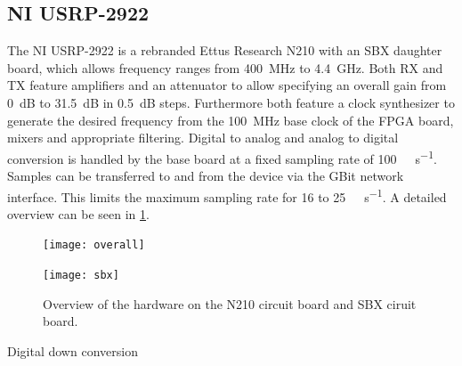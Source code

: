 \documentclass[12pt,a4paper,parskip=full]{scrartcl}
\begin{document}
\subsection{NI USRP-2922}
The NI USRP-2922 is a rebranded Ettus Research N210 with an SBX daughter board, which
allows frequency ranges from \SI{400}{\mega\hertz} to \SI{4.4}{\giga\hertz}. Both RX
and TX feature amplifiers and an attenuator to allow specifying an overall gain from
\SI{0}{\deci\bel} to \SI{31.5}{\deci\bel} in \SI{0.5}{\deci\bel} steps. Furthermore
both feature a clock synthesizer to generate the desired frequency from the \SI{100}{\mega\hertz}
base clock of the FPGA board, mixers and appropriate filtering. Digital to analog and analog to
digital conversion is handled by the base board at a fixed sampling rate of
\SI{100}{\mega\samples\per\second}. Samples can be transferred to and from the device via the
GBit network interface. This limits the maximum sampling rate for \SI{16}{\bit} to
\SI{25}{\mega\samples\per\second}. A detailed overview can be seen in \ref{fig:usrp}. %
\begin{figure}[ht]
    \centering
    \begin{minipage}{0.45\textwidth}
        \centering
        \texttt{[image: overall]}
    \end{minipage}
    \begin{minipage}{0.45\textwidth}
        \centering
        \texttt{[image: sbx]}
    \end{minipage}
    \caption{Overview of the hardware on the N210 circuit board and SBX ciruit board\cite{flo}.}
    \label{fig:usrp}
\end{figure}
Digital down conversion
\end{document}
